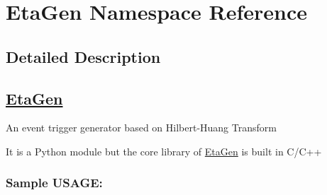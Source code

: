 \hypertarget{namespaceEtaGen}{\section{Eta\-Gen Namespace Reference}
\label{namespaceEtaGen}
}


\subsection{Detailed Description}
\subsection*{\hyperlink{namespaceEtaGen}{Eta\-Gen}}

An event trigger generator based on Hilbert-\/\-Huang Transform\par
 It is a Python module but the core library of \hyperlink{namespaceEtaGen}{Eta\-Gen} is built in C/\-C++

\subsubsection*{Sample U\-S\-A\-G\-E\-:}


